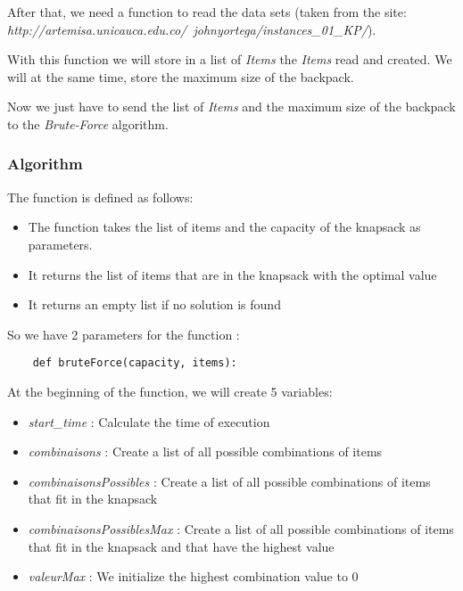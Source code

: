\documentclass[12pt]{article}
\begin{document}
            After that, we need a function to read the data sets (taken from the site: \emph{http://artemisa.unicauca.edu.co/~johnyortega/instances\_01\_KP/}).\newline

            With this function we will store in a list of \emph{Items} the \emph{Items} read and created. We will at the same time, store the maximum size of the backpack.\newline

            Now we just have to send the list of \emph{Items} and the maximum size of the backpack to the \emph{Brute-Force} algorithm.
            
        \subsubsection{Algorithm}
        
            The function is defined as follows:
            \begin{itemize}
                \item The function takes the list of items and the capacity of the knapsack as parameters.
                \item It returns the list of items that are in the knapsack with the optimal value
                \item It returns an empty list if no solution is found
            \end{itemize}
            
            So we have 2 parameters for the function :

            \begin{lstlisting}
    def bruteForce(capacity, items):
            \end{lstlisting}

            At the beginning of the function, we will create 5 variables:
            \begin{itemize}
                \item \emph{start\_time} : Calculate the time of execution
                \item \emph{combinaisons} : Create a list of all possible combinations of items
                \item \emph{combinaisonsPossibles} : Create a list of all possible combinations of items that fit in the knapsack
                \item \emph{combinaisonsPossiblesMax} : Create a list of all possible combinations of items that fit in the knapsack and that have the highest value
                \item \emph{valeurMax} : We initialize the highest combination value to 0
            \end{itemize}
\end{document}
